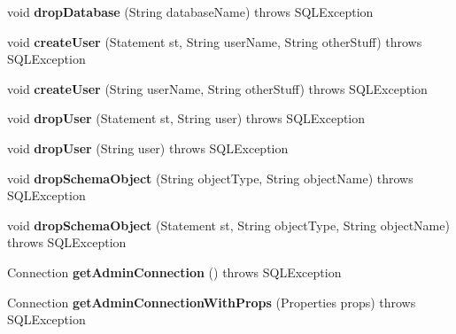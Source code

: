 \begin{DoxyCompactItemize}
void {\bfseries drop\+Database} (String database\+Name)  throws S\+Q\+L\+Exception 
\item 
\mbox{\label{classtestsuite_1_1_base_test_case_a572945638013e76cba6fa17a9e7f4ee5}} 
void {\bfseries create\+User} (Statement st, String user\+Name, String other\+Stuff)  throws S\+Q\+L\+Exception 
\item 
\mbox{\label{classtestsuite_1_1_base_test_case_afd3a6d04fc70a7d2fbff92ed1e8cb01d}} 
void {\bfseries create\+User} (String user\+Name, String other\+Stuff)  throws S\+Q\+L\+Exception 
\item 
\mbox{\label{classtestsuite_1_1_base_test_case_a977fa9542cf99aaec9354c7fa6b2a677}} 
void {\bfseries drop\+User} (Statement st, String user)  throws S\+Q\+L\+Exception 
\item 
\mbox{\label{classtestsuite_1_1_base_test_case_a9a9d1bad807c93b02d0cdfda3b217195}} 
void {\bfseries drop\+User} (String user)  throws S\+Q\+L\+Exception 
\item 
\mbox{\label{classtestsuite_1_1_base_test_case_a8778ffee4f5311ddcf9f34a431e65fd5}} 
void {\bfseries drop\+Schema\+Object} (String object\+Type, String object\+Name)  throws S\+Q\+L\+Exception 
\item 
\mbox{\label{classtestsuite_1_1_base_test_case_a7c25fb4e0676e75d993648ef990ee28f}} 
void {\bfseries drop\+Schema\+Object} (Statement st, String object\+Type, String object\+Name)  throws S\+Q\+L\+Exception 
\item 
\mbox{\label{classtestsuite_1_1_base_test_case_a5aac2df8b2b635a640bd2ca0f9df4f63}} 
Connection {\bfseries get\+Admin\+Connection} ()  throws S\+Q\+L\+Exception 
\item 
\mbox{\label{classtestsuite_1_1_base_test_case_a1b9097dbfa04cb3fda0be74767ee8b02}} 
Connection {\bfseries get\+Admin\+Connection\+With\+Props} (Properties props)  throws S\+Q\+L\+Exception 
\item 

\end{DoxyCompactItemize}
